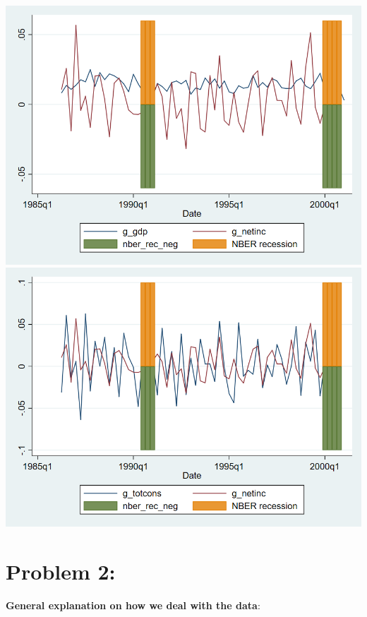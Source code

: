 \documentclass[12pt,a4paper]{article}
\begin{document}
\begin{center}
\includegraphics[width=14cm]{inc_gdp.png}\\
\includegraphics[width=14cm]{inc_cons.png}\\
\end{center}


\section*{Problem 2: }

\textbf{General explanation on how we deal with the data}:
\end{document}
